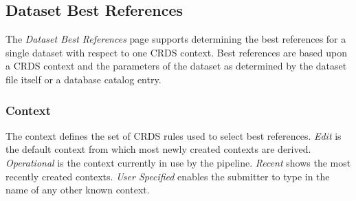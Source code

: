 \documentclass[letterpaper,10pt,english]{sphinxmanual}
\begin{document}
\subsection{Dataset Best References}
\label{web_site_use:dataset-best-references}
The \emph{Dataset Best References} page supports determining the best references for
a single dataset with respect to one CRDS context.   Best references are based
upon a CRDS context and the parameters of the dataset as determined by the
dataset file itself or a database catalog entry.
\begin{figure}[htbp]
\centering

\end{figure}


\subsubsection{Context}
\label{web_site_use:context}
The context defines the set of CRDS rules used to select best references.
\emph{Edit} is the default context from which most newly created contexts are derived.
\emph{Operational} is the context currently in use by the pipeline.   \emph{Recent} shows
the most recently created contexts.   \emph{User Specified} enables the submitter to
type in the name of any other known context.
\end{document}
